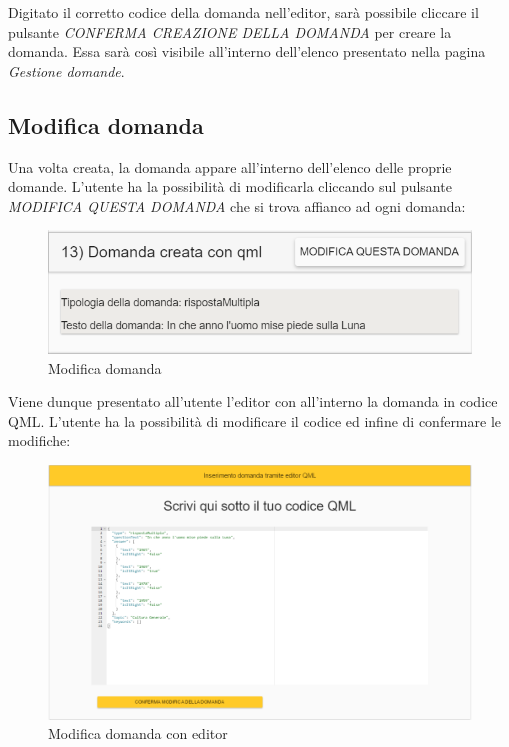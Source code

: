 Digitato il corretto codice della domanda nell'editor, sarà possibile cliccare il pulsante \textit{CONFERMA CREAZIONE DELLA DOMANDA} per creare la domanda. Essa sarà così visibile all'interno dell'elenco presentato nella pagina \textit{Gestione domande}.

\newpage
\subsection{Modifica domanda}
Una volta creata, la domanda appare all'interno dell'elenco delle proprie domande. L'utente ha la possibilità di modificarla cliccando sul pulsante \textit{MODIFICA QUESTA DOMANDA} che si trova affianco ad ogni domanda:

\label{ModificaDomanda}
\begin{figure}[ht]
	\centering
	\includegraphics[scale=0.50]{img/modifica_domanda.png}
	\caption{Modifica domanda}
\end{figure}
\FloatBarrier

Viene dunque presentato all'utente l'editor con all'interno la domanda in codice QML. L'utente ha la possibilità di modificare il codice ed infine di confermare le modifiche:

\label{ModificaEditor}
\begin{figure}[ht]
	\centering
	\includegraphics[scale=0.45]{img/modifica_editor.png}
	\caption{Modifica domanda con editor}
\end{figure}
\FloatBarrier 